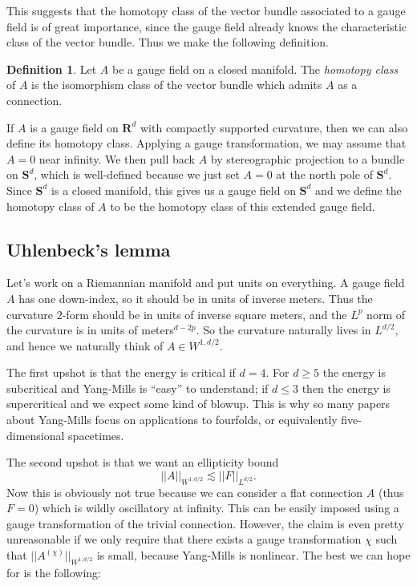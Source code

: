 \documentclass[reqno,11pt]{amsart}
\newcommand{\RR}{\mathbf{R}}
\newcommand{\Sph}{\mathbf S}
\newcommand{\dfn}[1]{\emph{#1}\index{#1}}
\theoremstyle{definition}
\newtheorem{definition}[theorem]{Definition}
\numberwithin{equation}{section}
\begin{document}
This suggests that the homotopy class of the vector bundle associated to a gauge field is of great importance, since the gauge field already knows the characteristic class of the vector bundle.
Thus we make the following definition.

\begin{definition}
Let $A$ be a gauge field on a closed manifold.
The \dfn{homotopy class} of $A$ is the isomorphism class of the vector bundle which admits $A$ as a connection.
\end{definition}

If $A$ is a gauge field on $\RR^d$ with compactly supported curvature, then we can also define its homotopy class.
Applying a gauge transformation, we may assume that $A = 0$ near infinity.
We then pull back $A$ by stereographic projection to a bundle on $\Sph^d$, which is well-defined because we just set $A = 0$ at the north pole of $\Sph^d$.
Since $\Sph^d$ is a closed manifold, this gives us a gauge field on $\Sph^d$ and we define the homotopy class of $A$ to be the homotopy class of this extended gauge field.

\subsection{Uhlenbeck's lemma}
Let's work on a Riemannian manifold and put units on everything.
A gauge field $A$ has one down-index, so it should be in units of inverse meters.
Thus the curvature $2$-form should be in units of inverse square meters, and the $L^p$ norm of the curvature is in units of meters$^{d - 2p}$.
So the curvature naturally lives in $L^{d/2}$, and hence we naturally think of $A \in W^{1, d/2}$.

The first upshot is that the energy is critical if $d = 4$.
For $d \geq 5$ the energy is subcritical and Yang-Mills is ``easy'' to understand; if $d \leq 3$ then the energy is supercritical and we expect some kind of blowup.
This is why so many papers about Yang-Mills focus on applications to fourfolds, or equivalently five-dimensional spacetimes.

The second upshot is that we want an ellipticity bound 
$$||A||_{W^{1, d/2}} \lesssim ||F||_{L^{d/2}}.$$
Now this is obviously not true because we can consider a flat connection $A$ (thus $F = 0$) which is wildly oscillatory at infinity.
This can be easily imposed using a gauge transformation of the trivial connection.
However, the claim is even pretty unreasonable if we only require that there exists a gauge transformation $\chi$ such that $||A^{(\chi)}||_{W^{1, d/2}}$ is small, because Yang-Mills is nonlinear.
The best we can hope for is the following:
\end{document}
